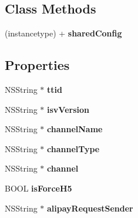 \subsection*{Class Methods}
\begin{DoxyCompactItemize}
\item 
\mbox{\label{interface_alibc_config_service_ac2caf8c7c9577aa74d4fb673af5ebf83}} 
(instancetype) + {\bfseries shared\+Config}
\end{DoxyCompactItemize}
\subsection*{Properties}
\begin{DoxyCompactItemize}
\item 
\mbox{\label{interface_alibc_config_service_a1f033949031cca8e99f2659d80456226}} 
N\+S\+String $\ast$ {\bfseries ttid}
\item 
\mbox{\label{interface_alibc_config_service_a533e7d6a55853a8c7b69eae38efdf05c}} 
N\+S\+String $\ast$ {\bfseries isv\+Version}
\item 
\mbox{\label{interface_alibc_config_service_a5d6376acc4ab767b66ad4a8268253a7e}} 
N\+S\+String $\ast$ {\bfseries channel\+Name}
\item 
\mbox{\label{interface_alibc_config_service_a82d560656f898a8eeb912d3c14a5c497}} 
N\+S\+String $\ast$ {\bfseries channel\+Type}
\item 
\mbox{\label{interface_alibc_config_service_ac97e2a86981e2aa5a9e6d5d326780aee}} 
N\+S\+String $\ast$ {\bfseries channel}
\item 
\mbox{\label{interface_alibc_config_service_a9966c9c722126aad8f7766e480607daa}} 
B\+O\+OL {\bfseries is\+Force\+H5}
\item 
\mbox{\label{interface_alibc_config_service_ab2d39658b591e6b93dbf0fa2475738d7}} 
N\+S\+String $\ast$ {\bfseries alipay\+Request\+Sender}
\item 

\end{DoxyCompactItemize}
